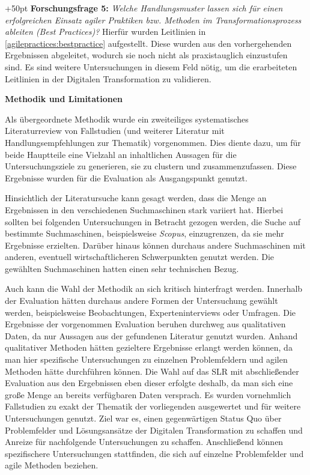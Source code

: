 \hangindent+50pt 
\textbf{Forschungsfrage 5:} \textit{Welche Handlungsmuster lassen sich für einen erfolgreichen Einsatz agiler Praktiken bzw. Methoden im Transformationsprozess ableiten (Best Practices)?}  Hierfür wurden Leitlinien in \ref{agilepractices:bestpractice} aufgestellt. Diese wurden aus den vorhergehenden Ergebnissen abgeleitet, wodurch sie noch nicht als praxistauglich einzustufen sind. Es sind weitere Untersuchungen in diesem Feld nötig, um die erarbeiteten Leitlinien in der Digitalen Transformation zu validieren.

\clearpage

\textbf{Methodik und Limitationen} 

Als übergeordnete Methodik wurde ein zweiteiliges systematisches Literaturreview von Fallstudien (und weiterer Literatur mit Handlungsempfehlungen zur Thematik) vorgenommen. Dies diente dazu, um für beide Hauptteile eine Vielzahl an inhaltlichen Aussagen für die Untersuchungsziele zu generieren, sie zu clustern und zusammenzufassen. Diese Ergebnisse wurden für die Evaluation als Ausgangspunkt genutzt. 

Hinsichtlich der Literatursuche kann gesagt werden, dass die Menge an Ergebnissen in den verschiedenen Suchmaschinen stark variiert hat. Hierbei sollten bei folgenden Untersuchungen in Betracht gezogen werden, die Suche auf bestimmte Suchmaschinen, beispielsweise \textit{Scopus}, einzugrenzen, da sie mehr Ergebnisse erzielten. Darüber hinaus können durchaus andere Suchmaschinen mit anderen, eventuell wirtschaftlicheren Schwerpunkten genutzt werden. Die gewählten Suchmaschinen hatten einen sehr technischen Bezug.

Auch kann die Wahl der Methodik an sich kritisch hinterfragt werden. Innerhalb der Evaluation hätten durchaus andere Formen der Untersuchung gewählt werden, beispielsweise Beobachtungen, Experteninterviews oder Umfragen. Die Ergebnisse der vorgenommen Evaluation beruhen durchweg aus qualitativen Daten, da nur Aussagen aus der gefundenen Literatur genutzt wurden. Anhand qualitativer Methoden hätten gezieltere Ergebnisse erlangt werden können, da man hier spezifische Untersuchungen zu einzelnen Problemfeldern und agilen Methoden hätte durchführen können. Die Wahl auf das SLR mit abschließender Evaluation aus den Ergebnissen eben dieser erfolgte deshalb, da man sich eine große Menge an bereits verfügbaren Daten versprach. Es wurden vornehmlich Fallstudien zu exakt der Thematik der vorliegenden ausgewertet und für weitere Untersuchungen genutzt. Ziel war es, einen gegenwärtigen Status Quo über Problemfelder und Lösungsansätze der Digitalen Transformation zu schaffen und Anreize für nachfolgende Untersuchungen zu schaffen. Anschließend können spezifischere Untersuchungen stattfinden, die sich auf einzelne Problemfelder und agile Methoden beziehen. 

